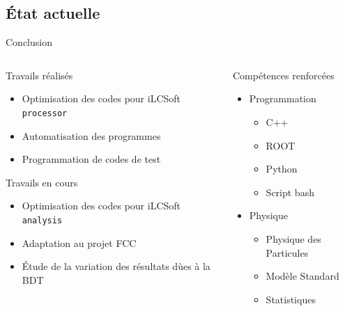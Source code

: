 \documentclass[9pt]{beamer}
\begin{document}
\subsection{État actuelle}
\begin{frame}{Conclusion}

\begin{columns}

	\begin{column}{0.45\textwidth}
		\begin{exampleblock}{Travails réalisés}
			\begin{itemize}
		 		\item Optimisation des codes pour iLCSoft \texttt{processor}
		 		\item Automatisation des programmes
		 		\item Programmation de codes de test
			\end{itemize}
		\end{exampleblock}
        \begin{alertblock}{Travails en cours}
			\begin{itemize}
		 		\item Optimisation des codes pour iLCSoft \texttt{analysis}
		 		\item Adaptation au projet FCC
                \item Étude de la variation des résultats dùes à la BDT
			\end{itemize}
		\end{alertblock}
	\end{column}
	
	\begin{column}{0.45\textwidth}
		\begin{block}{Compétences renforcées}
			\begin{itemize}
                \item Programmation
                \begin{itemize}
                    \item C++
                    \item ROOT
                    \item Python
                    \item Script bash
                \end{itemize}
                
                \item Physique
                \begin{itemize}
                    \item Physique des Particules
                    \item Modèle Standard
                    \item Statistiques
                \end{itemize}
            

\end{itemize}
\end{block}
\end{column}
\end{columns}
\end{frame}
\end{document}
